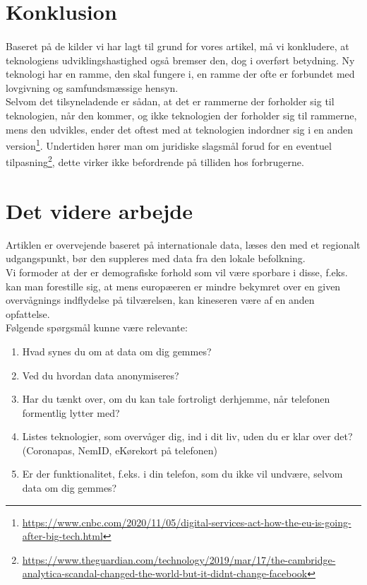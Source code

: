 \documentclass{article}
\begin{document}
\section{Konklusion}
\paragraph{}
Baseret på de kilder vi har lagt til grund for vores artikel, må vi konkludere, at teknologiens udviklingshastighed også bremser den, dog i overført betydning. Ny teknologi har en ramme, den skal fungere i, en ramme der ofte er forbundet med lovgivning og samfundsmæssige hensyn. \\
Selvom det tilsyneladende er sådan, at det er rammerne der forholder sig til teknologien, når den kommer, og ikke teknologien der forholder sig til rammerne, mens den udvikles, ender det oftest med at teknologien indordner sig i en anden version\footnote{\url{https://www.cnbc.com/2020/11/05/digital-services-act-how-the-eu-is-going-after-big-tech.html}}.
Undertiden hører man om juridiske slagsmål forud for en eventuel tilpasning\footnote{\url{https://www.theguardian.com/technology/2019/mar/17/the-cambridge-analytica-scandal-changed-the-world-but-it-didnt-change-facebook}}, dette virker ikke befordrende på tilliden hos forbrugerne.

\section{Det videre arbejde}
Artiklen er overvejende baseret på internationale data, læses den med et regionalt udgangspunkt, bør den suppleres med data fra den lokale befolkning. \\
Vi formoder at der er demografiske forhold som vil være sporbare i disse, f.eks. kan man forestille sig, at mens europæeren er mindre bekymret over en given overvågnings indflydelse på tilværelsen, kan kineseren være af en anden opfattelse.
\\
Følgende spørgsmål kunne være relevante:
\begin{enumerate}
    \item Hvad synes du om at data om dig gemmes?
    \item Ved du hvordan data anonymiseres?
    \item Har du tænkt over, om du kan tale fortroligt derhjemme, når telefonen formentlig lytter med?
    \item Listes teknologier, som overvåger dig, ind i dit liv, uden du er klar over det? (Coronapas, NemID, eKørekort på telefonen)
    \item Er der funktionalitet, f.eks. i din telefon, som du ikke vil undvære, selvom data om dig gemmes?
\end{enumerate}
\end{document}

